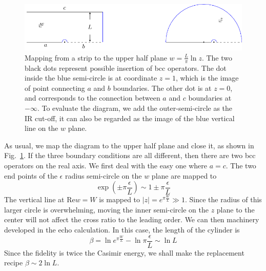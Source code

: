 \documentclass{article}
\begin{document}
\begin{figure}[h]
\centering
\includegraphics[width=\textwidth]{fig_fidel-map}
\caption{Mapping from a strip to the upper half plane $w = \frac{L}{\pi} \ln z $. The two black dots represent possible insertion of bcc operators. The dot inside the blue semi-circle is at coordinate $z = 1$, which is the image of point connecting $a$ and $b$ boundaries. The other dot is at $z = 0$, and corresponds to the connection between $a$ and $c$ boundaries at $- \infty$. To evaluate the diagram, we add the outer-semi-circle as the IR cut-off, it can also be regarded as the image of the blue vertical line on the $w$ plane.}
\label{fig:fidel-map}
\end{figure}



As usual, we map the diagram to the upper half plane and close it, as shown in Fig.~\ref{fig:fidel-map}. If the three boundary conditions are all different, then there are two bcc operators on the real axis. We first deal with the easy one where $a = c$. The two end points of the $\epsilon$ radius semi-circle on the $w$ plane are mapped to
\begin{equation}
\exp( \pm \pi \frac{\epsilon}{ L}  ) \sim 1 \pm \pi \frac{\epsilon}{L} 
\end{equation}
The vertical line at $\text{Re} w = W$ is mapped to $|z| = e^{\pi \frac{W}{L} } \gg 1 $. Since the radius of this larger circle is overwhelming, moving the inner semi-circle on the $z$ plane to the center will not affect the cross ratio to the leading order. We can then machinery developed in the echo calculation. In this case, the length of the cylinder is
\begin{equation}
\beta = \ln e^{\pi \frac{W}{L}} - \ln \pi \frac{\epsilon}{L}  \sim \ln L 
\end{equation}
Since the fidelity is twice the Casimir energy, we shall make the replacement recipe $\beta \sim 2 \ln L$. 



\end{document}
